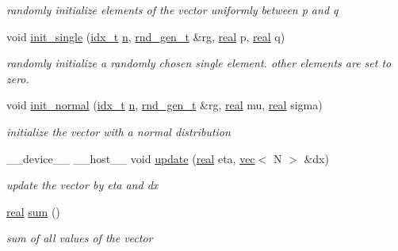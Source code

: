 \begin{DoxyCompactItemize}
\begin{DoxyCompactList}\small\item\em randomly initialize elements of the vector uniformly between p and q \end{DoxyCompactList}\item 
void \hyperlink{structvec_ada7a8f64e872717520fc50c061bddb7a}{init\+\_\+single} (\hyperlink{vgg__util_8h_a8e93478a00e685bea5e6a3f617bf03a3}{idx\+\_\+t} \hyperlink{structvec_a8e2947aa75530f74cac781347dd97e98}{n}, \hyperlink{structrnd__gen__t}{rnd\+\_\+gen\+\_\+t} \&rg, \hyperlink{vgg__util_8h_a1082d08aaa761215ec83e7149f27ad16}{real} p, \hyperlink{vgg__util_8h_a1082d08aaa761215ec83e7149f27ad16}{real} q)
\begin{DoxyCompactList}\small\item\em randomly initialize a randomly chosen single element. other elements are set to zero. \end{DoxyCompactList}\item 
void \hyperlink{structvec_a67699ea5f0b7b076b18e4dad7f62c650}{init\+\_\+normal} (\hyperlink{vgg__util_8h_a8e93478a00e685bea5e6a3f617bf03a3}{idx\+\_\+t} \hyperlink{structvec_a8e2947aa75530f74cac781347dd97e98}{n}, \hyperlink{structrnd__gen__t}{rnd\+\_\+gen\+\_\+t} \&rg, \hyperlink{vgg__util_8h_a1082d08aaa761215ec83e7149f27ad16}{real} mu, \hyperlink{vgg__util_8h_a1082d08aaa761215ec83e7149f27ad16}{real} sigma)
\begin{DoxyCompactList}\small\item\em initialize the vector with a normal distribution \end{DoxyCompactList}\item 
\+\_\+\+\_\+device\+\_\+\+\_\+ \+\_\+\+\_\+host\+\_\+\+\_\+ void \hyperlink{structvec_a7e0e7a2cfeeb98471a9ee4c8ea832308}{update} (\hyperlink{vgg__util_8h_a1082d08aaa761215ec83e7149f27ad16}{real} eta, \hyperlink{structvec}{vec}$<$ N $>$ \&dx)
\begin{DoxyCompactList}\small\item\em update the vector by eta and dx \end{DoxyCompactList}\item 
\mbox{\label{structvec_a0d91cea4932972e60e8a4fe9ad6dc0a2}} 
\hyperlink{vgg__util_8h_a1082d08aaa761215ec83e7149f27ad16}{real} \hyperlink{structvec_a0d91cea4932972e60e8a4fe9ad6dc0a2}{sum} ()
\begin{DoxyCompactList}\small\item\em sum of all values of the vector \end{DoxyCompactList}\item 

\end{DoxyCompactItemize}
